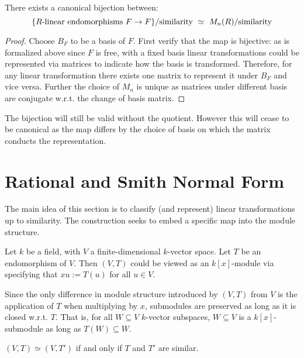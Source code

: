 \begin{proposition}\label{prop:canonical bijection}
    There exists a canonical bijection between:
    \[
        \{ R\text{\upshape{-linear endomorphisms}}\ F\to F \} / \text{\upshape{similarity}}\ \simeq\ M_n(R) / \text{\upshape{similarity}}
    \]
\end{proposition}

\begin{proof}
    Choose $B_F$ to be a basis of $F$. First verify that the map is bijective: as is formalized above since $F$ is free, with a fixed basis linear transformations could be represented via matrices to indicate how the basis is transformed. Therefore, for any linear transformation there exists one matrix to represent it under $B_F$ and vice versa. Further the choice of $M_n$ is unique as matrices under different basis are conjugate w.r.t. the change of basis matrix.
\end{proof}

\begin{remark}
    The bijection will still be valid without the quotient. However this will cease to be canonical as the map differs by the choice of basis on which the matrix conducts the representation.
\end{remark}

\section{Rational and Smith Normal Form}

The main idea of this section is to classify (and represent) linear transformations up to similarity. The construction seeks to embed a specific map into the module structure.

Let $k$ be a field, with $V$ a finite-dimensional $k$-vector space. Let $T$ be an endomorphism of $V$. Then $(V, T)$ could be viewed as an $k[x]$-module via specifying that $xu := T(u)$ for all $u\in V$. 

\begin{remark}
    Since the only difference in module structure introduced by $(V, T)$ from $V$ is the application of $T$ when multiplying by $x$, submodules are preserved as long as it is closed w.r.t. $T$. That is, for all $W \subseteq V$ $k$-vector subspaces, $W\subseteq V$ is a $k[x]$-submodule as long as $T(W) \subseteq W$.  
\end{remark}

\begin{proposition}\label{prop:(V, T) isom}
    $(V, T) \simeq (V, T')$ if and only if $T$ and $T'$ are similar.
\end{proposition}

